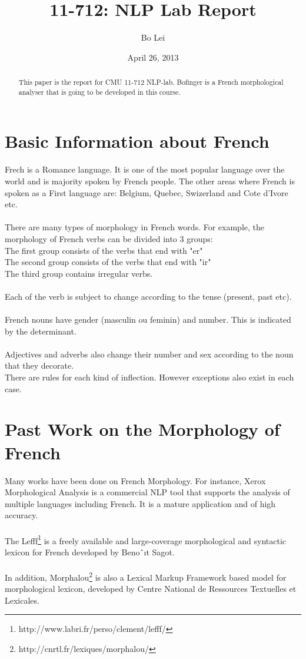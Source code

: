 \documentclass[11pt,letterpaper]{article}
\title{11-712:  NLP Lab Report}
\author{Bo Lei}
\date{April 26, 2013}
\begin{document}
\maketitle
\begin{abstract}
This paper is the report for CMU 11-712 NLP-lab. Bofinger is a French morphological analyser that is going to be developed in this course.
\end{abstract}


\section{Basic Information about French}

Frech is a Romance language. It is one of the most popular language over the world and is majority spoken by French people. The other areas where French is spoken as a First language are: Belgium, Quebec, Swizerland and Cote d'Ivore etc.\\
\\
There are many types of morphology in French words. For example, the morphology of French verbs can be divided into 3 groups:\\

\indent\indent The first group consists of the verbs that end with "er"\\
\indent\indent The second group consists of the verbs that end with "ir"\\
\indent\indent The third group contains irregular verbs.\\
\\
Each of the verb is subject to change according to the tense (present, past etc).\\
\\
French nouns have gender (masculin ou feminin) and number. This is indicated by the determinant. \\
\\
Adjectives and adverbs also change their number and sex according to the noun that they decorate.
\\
There are rules for each kind of inflection. However exceptions also exist in each case.


\section{Past Work on the Morphology of French}
Many works have been done on French Morphology. For instance, Xerox Morphological Analysis is a commercial NLP tool that supports the analysis of multiple languages including French. It is a mature application and of high accuracy.\\
\\
The Lefff\footnote{http://www.labri.fr/perso/clement/lefff/} is a freely available and large-coverage morphological and syntactic lexicon for French developed by Benoˆıt Sagot. \\
\\
In addition, Morphalou\footnote{http://cnrtl.fr/lexiques/morphalou/} is also a Lexical Markup Framework based model for morphological lexicon, developed by Centre National de Ressources Textuelles et Lexicales. 
\end{document}
